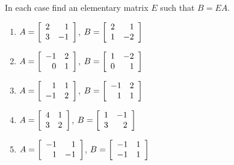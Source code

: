 \begin{multicols}{2}
\begin{ex}
\begin{sol}
\begin{enumerate}[label={\alph*.}]
\end{enumerate}
\end{sol}
\end{ex}

\columnbreak 
\begin{ex}
In each case find an elementary matrix $E$ such that $B = EA$.

\begin{enumerate}[label={\alph*.}]
\item $A = \left[ \begin{array}{rr}
2 & 1 \\
3 & -1
\end{array} \right]$, 
$B = \left[ \begin{array}{rr}
2 & 1 \\
1 & -2
\end{array} \right]$

\item $A = \left[ \begin{array}{rr}
-1 & 2 \\
0 & 1
\end{array} \right]$, 
$B = \left[ \begin{array}{rr}
1 & -2 \\
0 & 1
\end{array} \right]$

\item $A = \left[ \begin{array}{rr}
1 & 1 \\
-1 & 2
\end{array} \right]$, 
$B = \left[ \begin{array}{rr}
-1 & 2 \\
1 & 1
\end{array} \right]$

\item $A = \left[ \begin{array}{rr}
4 & 1 \\
3 & 2
\end{array} \right]$, 
$B = \left[ \begin{array}{rr}
1 & -1 \\
3 & 2
\end{array} \right]$

\item $A = \left[ \begin{array}{rr}
-1 & 1 \\
1 & -1
\end{array} \right]$, 
$B = \left[ \begin{array}{rr}
-1 & 1 \\
-1 & 1
\end{array} \right]$


\end{enumerate}
\end{ex}
\end{multicols}
